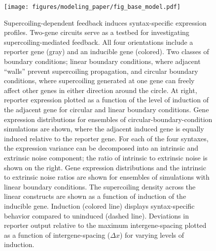 \documentclass[11pt]{article}
\begin{document}
\begin{figure}[ht]
    \centering
    {\texttt{[image: figures/modeling\_paper/fig\_base\_model.pdf]}
    \label{fig:base_orientations}
    \label{fig:bc_induction_sweep}
    \label{fig:circular_bc_distributions}
    \label{fig:linear_bc_distributions}
    \label{fig:base_model_sc_density}
    \label{fig:reporter_output_by_spacing_fold_induction}}
\end{figure}
\begin{figure}
    \ContinuedFloat
    \caption{Supercoiling-dependent feedback induces syntax-specific expression profiles.
         Two-gene circuits serve as a testbed for investigating supercoiling-mediated feedback. All four orientations include a reporter gene (gray) and an inducible gene (colored).
         Two classes of boundary conditions; linear boundary conditions, where adjacent ``walls'' prevent supercoiling propagation, and circular boundary conditions, where supercoiling generated at one gene can freely affect other genes in either direction around the circle. At right, reporter expression plotted as a function of the level of induction of the adjacent gene for circular and linear boundary conditions.  
         Gene expression distributions for ensembles of circular-boundary-condition simulations are shown, where the adjacent induced gene is equally induced relative to the reporter gene. For each of the four syntaxes, the expression variance can be decomposed into an intrinsic and extrinsic noise component; the ratio of intrinsic to extrinsic noise is shown on the right. 
         Gene expression distributions and the intrinsic to extrinsic noise ratios are shown for ensembles of simulations with linear boundary conditions. 
         The supercoiling density across the linear constructs are shown as a function of induction of the inducible gene. Induction (colored line) displays syntax-specific behavior compared to uninduced (dashed line).
         Deviations in reporter output relative to the maximum intergene-spacing plotted as a function of intergene-spacing (\(\Delta x\)) for varying levels of induction.
    } \label{fig:top:orientation_bc_behavior}
\end{figure}
\end{document}
